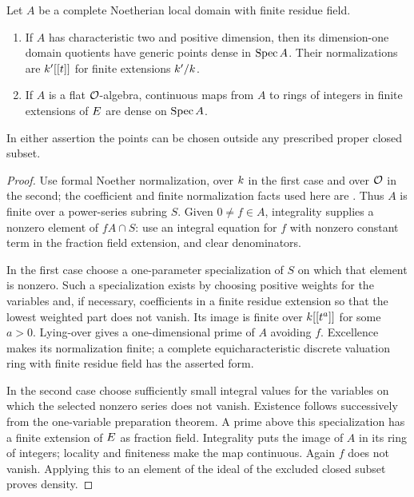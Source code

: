\begin{lemma}\label{lem:formal-point-density}
Let $A$ be a complete Noetherian local domain with finite residue field.
\begin{enumerate}
\item If $A$ has characteristic two and positive dimension, then its
dimension-one domain quotients have generic points dense in $\operatorname{Spec} A$.
Their normalizations are $k'[[t]]$ for finite extensions $k'/k$.
\item If $A$ is a flat $\mathcal O$-algebra, continuous maps from $A$ to rings
of integers in finite extensions of $E$ are dense on $\operatorname{Spec} A$.
\end{enumerate}
In either assertion the points can be chosen outside any prescribed
proper closed subset.
\end{lemma}

\begin{proof}
Use formal Noether normalization, over $k$ in the first case and
over $\mathcal O$ in the second; the coefficient and finite normalization
facts used here are \cite[Tags~032A, 032D, 07QW and~07QV]{StacksProject}.  Thus $A$ is finite over a power-series
subring $S$.  Given $0\ne f\in A$, integrality supplies a nonzero
element of $fA\cap S$: use an integral equation for $f$ with nonzero
constant term in the fraction field extension, and clear denominators.

In the first case choose a one-parameter specialization of $S$ on which
that element is nonzero.  Such a specialization exists by choosing
positive weights for the variables and, if necessary, coefficients in
a finite residue extension so that the lowest weighted part does not
vanish.  Its image is finite over $k[[t^a]]$ for some $a>0$.
Lying-over gives a one-dimensional prime of $A$ avoiding $f$.
Excellence makes its normalization finite; a complete
equicharacteristic discrete valuation ring with finite residue field
has the asserted form.

In the second case choose sufficiently small integral values for the
variables on which the selected nonzero series does not vanish.
Existence follows successively from the one-variable preparation
theorem.  A prime above this specialization has a finite extension of
$E$ as fraction field.  Integrality puts the image of $A$ in its
ring of integers; locality and finiteness make the map continuous.
Again $f$ does not vanish.  Applying this to an element of the ideal of
the excluded closed subset proves density.
\end{proof}

